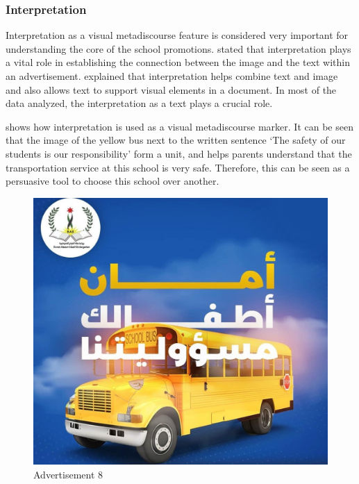 \documentclass[english]{textolivre}
\begin{document}
\subsubsection{Interpretation}\label{sec-secoes}
Interpretation as a visual metadiscourse feature is considered very important for understanding the core of the school promotions. \textcite{kumpf_visual_2000} stated that interpretation plays a vital role in establishing the connection between the image and the text within an advertisement. \textcite[p.~34]{al-subhi_metadiscourse_2022} explained that interpretation helps combine text and image and also allows text to support visual elements in a document. In most of the data analyzed, the interpretation as a text plays a crucial role.

 shows how interpretation is used as a visual metadiscourse marker. It can be seen that the image of the yellow bus next to the written sentence ‘The safety of our students is our responsibility’ form a unit, and helps parents understand that the transportation service at this school is very safe. Therefore, this can be seen as a persuasive tool to choose this school over another.

\begin{figure}[htbp]
\centering
\begin{minipage}{0.5\textwidth}
\includegraphics[width=\linewidth]{Fig8.png}
\caption{Advertisement 8}
\label{fig8}
\end{minipage}
\end{figure}
\end{document}
